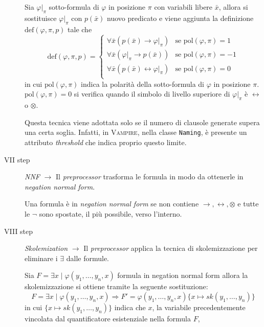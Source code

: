 \begin{description}
\begin{definition}
        Sia $\varphi|_\pi$ sotto-formula di $\varphi$ in posizione $\pi$ con variabili libere $\bar{x}$, allora si sostituisce $\varphi|_\pi$ con $p(\bar{x})$
        nuovo predicato e viene aggiunta la definizione $\text{def}(\varphi,\pi,p)$ tale che
        \[\text{def}(\varphi,\pi,p)=\begin{cases}
            \forall \bar{x} (p(\bar{x})\rightarrow \varphi|_\pi) & \text{se pol}(\varphi,\pi)=1\\
            \forall \bar{x} (\varphi|_\pi\rightarrow p(\bar{x})) & \text{se pol}(\varphi,\pi)=-1\\
            \forall \bar{x} (p(\bar{x})\leftrightarrow \varphi|_\pi) & \text{se pol}(\varphi,\pi)=0\\
        \end{cases}\]
        in cui $\text{pol}(\varphi,\pi)$ indica la polarità della sotto-formula di $\varphi$ in posizione $\pi$. $\text{pol}(\varphi,\pi)=0$ si verifica quando il simbolo di livello superiore di $\varphi|_\pi$ è 
        $\leftrightarrow$ o $\otimes$.   
    \end{definition}
    \begin{remark}
        Questa tecnica viene adottata solo se il numero di clausole generate supera una certa soglia. Infatti, in 
        \textsc{Vampire}, nella classe \verb|Naming|, è presente un attributo \emph{threshold} che indica proprio questo limite.
    \end{remark}
    \item[VII step] \emph{NNF} $\longrightarrow$ Il \emph{preprocessor} trasforma le formula in modo da ottenerle in \emph{negation normal form}.
    \begin{definition}
        Una formula è in \emph{negation normal form} se non contiene $\rightarrow,\leftrightarrow,\otimes$ e tutte le $\neg$ sono spostate, il più possibile, verso l'interno.
    \end{definition}
    \item[VIII step] \emph{Skolemization} $\longrightarrow$ Il \emph{preprocessor} applica la tecnica di skolemizzazione per eliminare i $\exists$ dalle formule.
    \begin{definition}
        Sia $F=\exists x\mid\varphi(y_1,\dots,y_n,x)$ formula in negation normal form allora la skolemizzazione si ottiene tramite la seguente sostituzione:
        \[F=\exists x\mid\varphi(y_1,\dots,y_n,x)\Rightarrow F'=\varphi(y_1,\dots,y_n,x)\{x \mapsto sk(y_1,\dots,y_n)\}\]
        in cui $\{x \mapsto sk(y_1,\dots,y_n)\}$ indica che $x$, la variabile precedentemente vincolata dal quantificatore esistenziale nella formula $F$, 

\end{definition}
\end{description}
